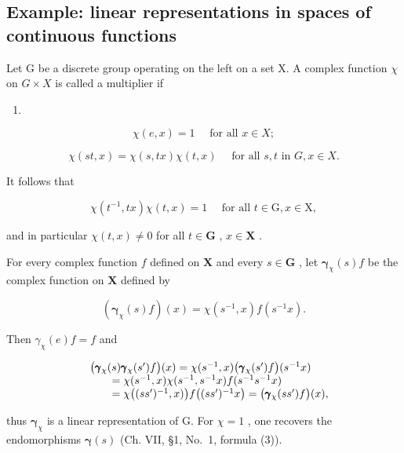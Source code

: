 \subsection{Example: linear representations in spaces of continuous functions}

Let G be a discrete group operating on the left on a set X. A complex function \(\chi\) on \(G \times X\) is called a multiplier if

\begin{enumerate}
\def\labelenumi{(\arabic{enumi})}
\tightlist
\item
\end{enumerate}

\[
\chi (e, x) = 1 \quad \text { for   all } x \in X;\tag{2}
\]

\[
\chi (s t, x) = \chi (s, t x) \chi (t, x) \quad \text { for   all } s, t \text { in } G, x \in X.
\]

It follows that

\[
\chi (t ^ {- 1}, t x) \chi (t, x) = 1 \quad \text { for   all } t \in \mathrm{G}, x \in \mathrm{X},\tag{3}
\]

and in particular \(\chi(t, x) \neq 0\) for all \(t \in \mathbf{G}\) , \(x \in \mathbf{X}\) .

For every complex function \(f\) defined on \(\mathbf{X}\) and every \(s \in \mathbf{G}\) , let \(\pmb{\gamma}_{\chi}(s)f\) be the complex function on \(\mathbf{X}\) defined by

\[
\left(\boldsymbol {\gamma} _ {\chi} (s) f\right) (x) = \chi (s ^ {- 1}, x) f (s ^ {- 1} x).\tag{4}
\]

Then \(\gamma_{\chi}(e)f = f\) and

\[
\begin{array}{r l} & {\big (\pmb {\gamma} _ {\chi} (s) \pmb {\gamma} _ {\chi} (s ^ {\prime}) f \big) (x) = \chi (s ^ {- 1}, x) \big (\pmb {\gamma} _ {\chi} (s ^ {\prime}) f \big) (s ^ {- 1} x)} \\ & {\qquad = \chi (s ^ {- 1}, x) \chi (s ^ {- 1}, s ^ {- 1} x) f (s ^ {- 1} s ^ {- 1} x)} \\ & {\qquad = \chi \big ((s s ^ {\prime}) ^ {- 1}, x) \big) f \big ((s s ^ {\prime}) ^ {- 1} x \big) = \big (\pmb {\gamma} _ {\chi} (s s ^ {\prime}) f \big) (x),} \end{array}
\]

thus \(\pmb{\gamma}_{\chi}\) is a linear representation of G. For \(\chi = 1\) , one recovers the endomorphisms \(\pmb{\gamma}(s)\) (Ch. VII, §1, No.~1, formula (3)).

